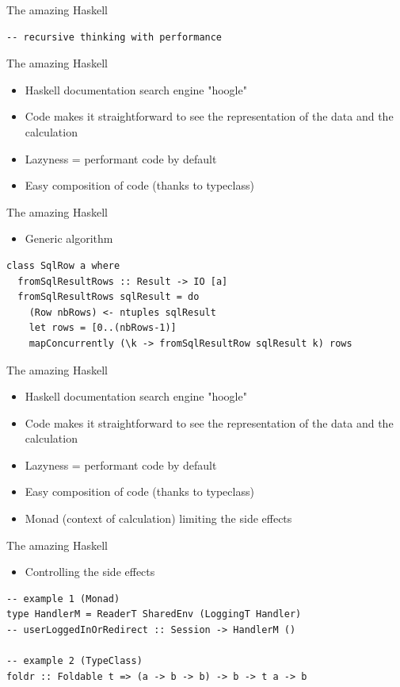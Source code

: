\documentclass[10pt]{beamer}
\begin{document}
\begin{frame}[fragile]{The amazing Haskell} 
\begin{verbatim}
-- recursive thinking with performance
\end{verbatim}
\end{frame} 

\begin{frame}{The amazing Haskell}
\begin{itemize}
\item Haskell documentation search engine "hoogle"
\item Code makes it straightforward to see the representation of the data and the calculation
\item Lazyness = performant code by default
\item Easy composition of code (thanks to typeclass)
\end{itemize}
\end{frame}

\begin{frame}[fragile]{The amazing Haskell} 
\begin{itemize}
\item Generic algorithm
\end{itemize}
\begin{verbatim}
class SqlRow a where
  fromSqlResultRows :: Result -> IO [a]
  fromSqlResultRows sqlResult = do
    (Row nbRows) <- ntuples sqlResult
    let rows = [0..(nbRows-1)]
    mapConcurrently (\k -> fromSqlResultRow sqlResult k) rows
\end{verbatim}
\end{frame} 

\begin{frame}{The amazing Haskell}
\begin{itemize}
\item Haskell documentation search engine "hoogle"
\item Code makes it straightforward to see the representation of the data and the calculation
\item Lazyness = performant code by default
\item Easy composition of code (thanks to typeclass)
\item Monad (context of calculation) limiting the side effects
\end{itemize}
\end{frame}

\begin{frame}[fragile]{The amazing Haskell} 
\begin{itemize}
\item Controlling the side effects
\end{itemize}
\begin{verbatim}
-- example 1 (Monad)
type HandlerM = ReaderT SharedEnv (LoggingT Handler)
-- userLoggedInOrRedirect :: Session -> HandlerM ()

-- example 2 (TypeClass)
foldr :: Foldable t => (a -> b -> b) -> b -> t a -> b
\end{verbatim}
\end{frame} 
\end{document}
